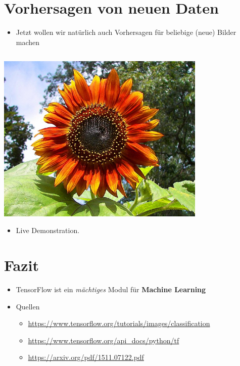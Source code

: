 \documentclass[t]{beamer}
\newcommand\pycode[1]{\inputminted[frame=lines, framesep=2mm, fontsize=\normalsize]{python}{#1}}
\begin{document}
\section{Vorhersagen von neuen Daten}
\begin{frame}
    \begin{itemize}
        \item Jetzt wollen wir natürlich auch Vorhersagen für beliebige (neue) Bilder machen
    \end{itemize}
    \pycode{./code-snippets/predict-new-image.py}
    \begin{minipage}{0.5\textwidth}
        \includegraphics[width=0.75\textwidth]{./teach-plots/592px-Red_sunflower.jpg}
    \end{minipage}\hfill
    \begin{minipage}{0.5\textwidth}
        \begin{itemize}
            \item \textcolor{rwthblue}{Live Demonstration.}
        \end{itemize}
    \end{minipage}
\end{frame}

\section{Fazit}
\begin{frame}
    \begin{itemize}
        \item TensorFlow ist ein \emph{mächtiges} Modul für \textbf{Machine Learning}
        \newline
        \item Quellen
        \begin{itemize}
            \item \href{https://www.tensorflow.org/tutorials/images/classification}{https://www.tensorflow.org/tutorials/images/classification}
            \item \href{https://www.tensorflow.org/api\_docs/python/tf}{https://www.tensorflow.org/api\_docs/python/tf}
            \item \href{https://arxiv.org/pdf/1511.07122.pdf}{https://arxiv.org/pdf/1511.07122.pdf}
        \end{itemize}
    \end{itemize}
\end{frame}
\end{document}
